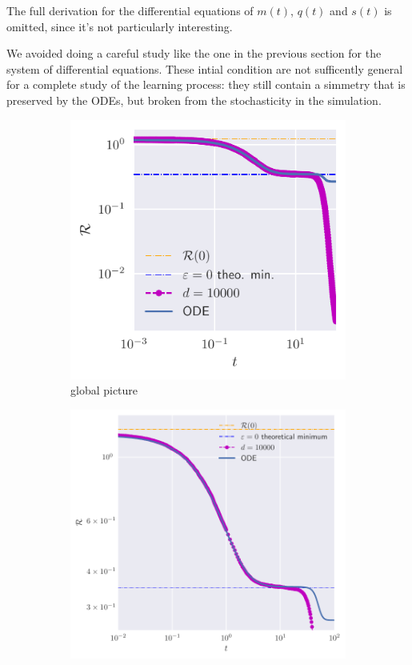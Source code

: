 The full derivation for the differential equations of \(m{(t)}\), \(q{(t)}\) and \(s{(t)}\) is 
omitted, since it's not particularly interesting. 

We avoided doing a careful study like the one in the previous section for the system of differential equations.
These intial condition are not sufficently general for a complete study of the learning process:
they still contain a simmetry that is preserved by the ODEs, but broken from the 
stochasticity in the simulation. 
\begin{figure}
  \centering
  \begin{subfigure}{0.45\textwidth}
    \includegraphics[width=1.\textwidth]{figures/example-small-eps.pdf}
    \caption{global picture}
  \end{subfigure}
  \begin{subfigure}{0.45\textwidth}
    \includegraphics[width=1.\textwidth]{figures/example-small-eps-zoomed.pdf}

\end{subfigure}
\end{figure}

